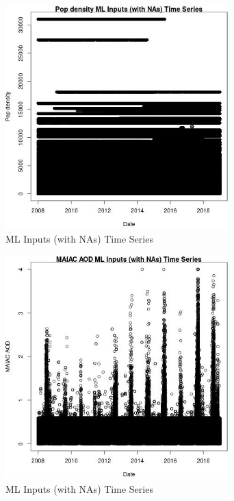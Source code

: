 \begin{figure} 
\centering  
\includegraphics[width=0.77\textwidth]{Code_Outputs/Report_ML_input_PM25_Step4_part_f_de_duplicated_aves_prioritize_24hr_obswNAs_Pop_densityvDate.jpg} 
\caption{\label{fig:Report_ML_input_PM25_Step4_part_f_de_duplicated_aves_prioritize_24hr_obswNAsPop_densityvDate}ML Inputs (with NAs) Time Series} 
\end{figure} 
 

\begin{figure} 
\centering  
\includegraphics[width=0.77\textwidth]{Code_Outputs/Report_ML_input_PM25_Step4_part_f_de_duplicated_aves_prioritize_24hr_obswNAs_MAIAC_AODvDate.jpg} 
\caption{\label{fig:Report_ML_input_PM25_Step4_part_f_de_duplicated_aves_prioritize_24hr_obswNAsMAIAC_AODvDate}ML Inputs (with NAs) Time Series} 
\end{figure} 
 

